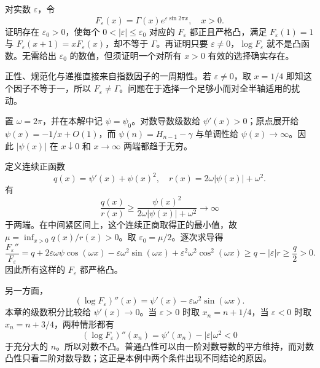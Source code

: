\begin{exercise}[普通凸性不能代替对数凸性]\label{b3:ex:21-4}
对实数 \(\varepsilon\)，令
\[
 F_\varepsilon(x)=\Gamma(x)e^{\varepsilon\sin2\pi x},\quad x>0.
\]
证明存在 \(\varepsilon_0>0\)，使每个 \(0<|\varepsilon|\le\varepsilon_0\) 对应的 \(F_\varepsilon\) 都正且严格凸，满足
\(F_\varepsilon(1)=1\) 与 \(F_\varepsilon(x+1)=xF_\varepsilon(x)\)，却不等于 \(\Gamma\)。再证明只要 \(\varepsilon\ne0\)，\(\log F_\varepsilon\) 就不是凸函数。无需给出 \(\varepsilon_0\) 的数值，但须证明一个对所有 \(x>0\) 有效的选择确实存在。
\end{exercise}
\begin{solution}
正性、规范化与递推直接来自指数因子的一周期性。若 \(\varepsilon\ne0\)，取 \(x=1/4\) 即知这个因子不等于一，所以 \(F_\varepsilon\ne\Gamma\)。问题在于选择一个足够小而对全半轴适用的扰动。

置 \(\omega=2\pi\)，并在本解中记 \(\psi=\psi_0\)。对数导数级数给 \(\psi'(x)>0\)；原点展开给 \(\psi(x)=-1/x+O(1)\)，而
\(\psi(n)=H_{n-1}-\gamma\) 与单调性给 \(\psi(x)\to\infty\)。因此 \(|\psi(x)|\) 在 \(x\downarrow0\) 和 \(x\to\infty\) 两端都趋于无穷。

定义连续正函数
\[
 q(x)=\psi'(x)+\psi(x)^2,\quad
 r(x)=2\omega|\psi(x)|+\omega^2.
\]
有
\[
 \frac{q(x)}{r(x)}
 \ge\frac{\psi(x)^2}{2\omega|\psi(x)|+\omega^2}
 \longrightarrow\infty
\]
于两端。在中间紧区间上，这个连续正商取得正的最小值，故
\(\mu=\inf_{x>0}q(x)/r(x)>0\)。取 \(\varepsilon_0=\mu/2\)。逐次求导得
\[
 \frac{F_\varepsilon''}{F_\varepsilon}
 =q+2\varepsilon\omega\psi\cos(\omega x)
   -\varepsilon\omega^2\sin(\omega x)
   +\varepsilon^2\omega^2\cos^2(\omega x)
 \ge q-|\varepsilon|r\ge\frac q2>0.
\]
因此所有这样的 \(F_\varepsilon\) 都严格凸。

另一方面，
\[
 (\log F_\varepsilon)''(x)
 =\psi'(x)-\varepsilon\omega^2\sin(\omega x).
\]
本章的级数积分比较给 \(\psi'(x)\to0\)。当 \(\varepsilon>0\) 时取 \(x_n=n+1/4\)，当 \(\varepsilon<0\) 时取 \(x_n=n+3/4\)，两种情形都有
\[
 (\log F_\varepsilon)''(x_n)
 =\psi'(x_n)-|\varepsilon|\omega^2<0
\]
于充分大的 \(n\)。所以对数不凸。普通凸性可以由一阶对数导数的平方维持，而对数凸性只看二阶对数导数；这正是本例中两个条件出现不同结论的原因。
\end{solution}

